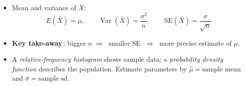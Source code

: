 \documentclass[12pt]{book}
\begin{document}
\begin{itemize}
\item Mean and variance of $\bar{X}$:
      \[
        E(\bar{X})=\mu, \qquad
        \operatorname{Var}(\bar{X})=\frac{\sigma^{2}}{n}, \qquad
        \text{SE}(\bar{X})=\frac{\sigma}{\sqrt{n}}
      \]

\item \textbf{Key take-away}\,: bigger $n\;\Rightarrow\;$ smaller SE $\;\Rightarrow\;$ more precise estimate of $\mu$.

\item A \emph{relative-frequency histogram} shows sample data; a \emph{probability
      density function} describes the population.  
      Estimate parameters by $\hat{\mu}=\text{sample mean}$ and
      $\hat{\sigma}=\text{sample sd}$.

\end{itemize}



\newpage
\pagestyle{fancy}
\end{document}
